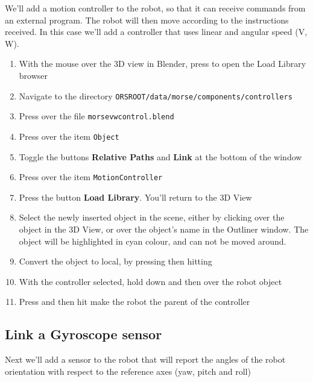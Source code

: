 \documentclass[twoside,a4paper,10pt]{report}
\newcommand{\dokutitleleveltree}[1]{\subsection{#1}}
\newcommand{\dokubold}[1]{\textbf{#1}}
\newcommand{\dokumonospace}[1]{\texttt{#1}}
\newcommand{\dokuitem}{\item}
\begin{document}
We'll add a motion controller to the robot, so that it can receive commands from an external program. The robot will then move according to the instructions received. In this case we'll add a controller that uses linear and angular speed (V, W).



\begin{enumerate}\dokuitem  With the mouse over the 3D view in Blender, press  to open the Load Library browser
\dokuitem  Navigate to the directory \dokumonospace{{\textdollar}ORS{\textunderscore}ROOT/data/morse/components/controllers}
\dokuitem  Press  over the file \dokumonospace{morse{\textunderscore}vw{\textunderscore}control.blend}
\dokuitem  Press  over the item \dokumonospace{Object}
\dokuitem  Toggle the buttons \dokubold{Relative Paths} and \dokubold{Link} at the bottom of the window
\dokuitem  Press  over the item \dokumonospace{Motion{\textunderscore}Controller}
\dokuitem  Press the button \dokubold{Load Library}. You'll return to the 3D View
\dokuitem  Select the newly inserted object in the scene, either by  clicking over the object in the 3D View, or  over the object's name in the Outliner window. The object will be highlighted in cyan colour, and can not be moved around.
\dokuitem  Convert the object to local, by pressing  then hitting 
\dokuitem  With the controller selected, hold down  and then  over the robot object
\dokuitem  Press  and then hit  make the robot the parent of the controller
\end{enumerate}

\dokutitleleveltree{Link a Gyroscope sensor}
\label{f019fe80659ff060e77872347a3add5c}%

Next we'll add a sensor to the robot that will report the angles of the robot orientation with respect to the reference axes (yaw, pitch and roll)
\end{document}
